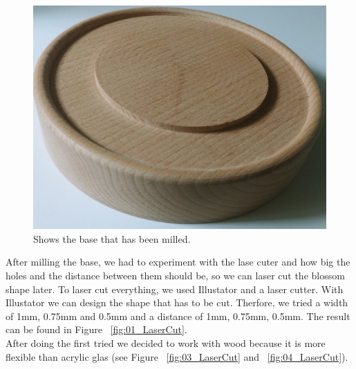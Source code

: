 \documentclass[doc.tex]{subfiles}
\begin{document}
        \begin{figure}[H]
            \centering
            \includegraphics[scale=0.05]{images/process/base.jpg}
            \caption{Shows the base that has been milled.}
            \label{fig:blossomBase}
        \end{figure}
        \noindent
        After milling the base, we had to experiment with the lase cuter and how big the holes and the distance between them 
        should be, so we can laser cut the blossom shape later. To laser cut everything, we used Illustator\cite{illustrator} and a laser cutter. 
        With Illustator we can design the shape that has to be cut. Therfore, we tried a width of 1mm, 0.75mm and 0.5mm and a distance
        of 1mm, 0.75mm, 0.5mm. The result can be found in Figure ~\ref{fig:01_LaserCut}.\\
        \noindent
        After doing the first tried we decided to work with wood because it is more flexible 
        than acrylic glas (see Figure ~\ref{fig:03_LaserCut} and ~\ref{fig:04_LaserCut}).
\end{document}
